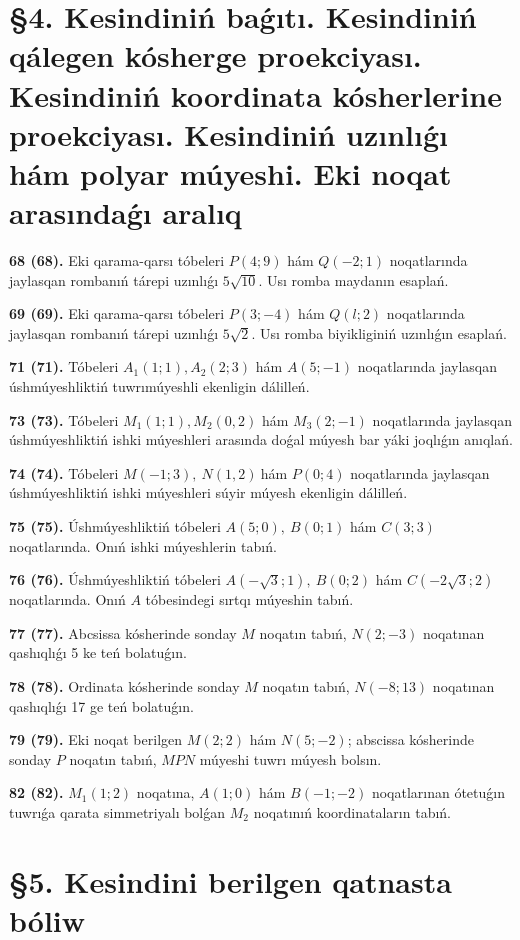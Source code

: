 \documentclass{article}
\begin{document}
\section*{\S 4. Kesindiniń baǵıtı. Kesindiniń qálegen kósherge proekciyası. 
Kesindiniń koordinata kósherlerine proekciyası. 
Kesindiniń uzınlıǵı hám polyar múyeshi. 
Eki noqat arasındaǵı aralıq}


\textbf{68 (68).} Eki qarama-qarsı tóbeleri \(P(4;9)\) hám \(Q(-2;
1)\) noqatlarında jaylasqan rombanıń tárepi uzınlıǵı \(5\sqrt{10}\). Usı
romba maydanın esaplań.

\textbf{69 (69).} Eki qarama-qarsı tóbeleri $P(3; -4)$ hám $Q(l;2)$ 
noqatlarında jaylasqan rombanıń tárepi uzınlıǵı \(5\sqrt{2}\). Usı
romba biyikliginiń uzınlıǵın esaplań.

\textbf{71 (71).} Tóbeleri $A_1(1; 1), A_2(2; 3)$ hám $A(5;-1)$
noqatlarında jaylasqan úshmúyeshliktiń tuwrımúyeshli ekenligin dálilleń.

\textbf{73 (73).} Tóbeleri \(M_{1}(1;1), M_{2}(0,2)\) hám
\(M_{3}(2;-1)\) noqatlarında jaylasqan úshmúyeshliktiń ishki
múyeshleri arasında doǵal múyesh bar yáki joqlıǵın anıqlań.

\textbf{74 (74).} Tóbeleri \(M(-1;3),\ N(1,2)\ \)hám \(P(0;4)\)
noqatlarında jaylasqan úshmúyeshliktiń ishki múyeshleri súyir múyesh
ekenligin dálilleń.

\textbf{75 (75).} Úshmúyeshliktiń tóbeleri \(A(5;0),\ B(0;1)\) hám \(C(3;3)\)
noqatlarında. Onıń ishki múyeshlerin tabıń.

\textbf{76 (76).} Úshmúyeshliktiń tóbeleri
\(A\left(-\sqrt{3};1 \right),\ B(0;2)\) hám
\(C\left(-2\sqrt{3};2 \right)\) noqatlarında. Onıń $A$
tóbesindegi sırtqı múyeshin tabıń.

\textbf{77 (77).} Abcsissa kósherinde sonday $M$ noqatın tabıń,
\(N(2;-3)\) noqatınan qashıqlıǵı 5 ke teń bolatuǵın.

\textbf{78 (78).} Ordinata kósherinde sonday $M$ noqatın tabıń,
\(N(-8;13)\) noqatınan qashıqlıǵı 17 ge teń bolatuǵın.

\textbf{79 (79).} Eki noqat berilgen \(M(2;2)\) hám \(N(5;-2)\); abscissa kósherinde sonday $P$ noqatın tabıń, $MPN$ múyeshi tuwrı múyesh bolsın.

\textbf{82 (82).} \(M_{1}(1;2)\) noqatına, \(A(1;0)\) hám \(B(-1;-2)\)
noqatlarınan ótetuǵın tuwrıǵa qarata simmetriyalı bolǵan \(M_{2}\) noqatınıń koordinataların tabıń.

\section*{\S 5. Kesindini berilgen qatnasta bóliw}
\end{document}
